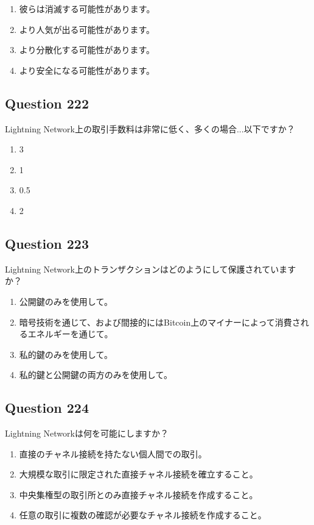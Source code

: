 \documentclass[12pt,a4paper]{article}
\begin{document}
\begin{enumerate}[label=\Alph*., leftmargin=*]
\item 彼らは消滅する可能性があります。
\item より人気が出る可能性があります。
\item より分散化する可能性があります。
\item より安全になる可能性があります。
\end{enumerate}

\bigskip


\subsection*{Question 222}
Lightning Network上の取引手数料は非常に低く、多くの場合...以下ですか？

\begin{enumerate}[label=\Alph*., leftmargin=*]
\item 3%
\item 1%
\item 0.5%
\item 2%
\end{enumerate}

\bigskip


\subsection*{Question 223}
Lightning Network上のトランザクションはどのようにして保護されていますか？

\begin{enumerate}[label=\Alph*., leftmargin=*]
\item 公開鍵のみを使用して。
\item 暗号技術を通じて、および間接的にはBitcoin上のマイナーによって消費されるエネルギーを通じて。
\item 私的鍵のみを使用して。
\item 私的鍵と公開鍵の両方のみを使用して。
\end{enumerate}

\bigskip


\subsection*{Question 224}
Lightning Networkは何を可能にしますか？

\begin{enumerate}[label=\Alph*., leftmargin=*]
\item 直接のチャネル接続を持たない個人間での取引。
\item 大規模な取引に限定された直接チャネル接続を確立すること。
\item 中央集権型の取引所とのみ直接チャネル接続を作成すること。
\item 任意の取引に複数の確認が必要なチャネル接続を作成すること。
\end{enumerate}
\end{document}
